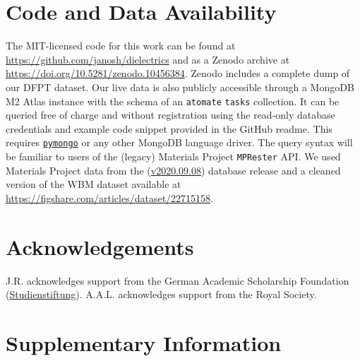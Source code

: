 \documentclass{article}
\begin{document}


\section*{Code and Data Availability}
\label{sec:code-availability}

The MIT-licensed code for this work can be found at \url{https://github.com/janosh/dielectrics} and as a Zenodo archive at \href{https://doi.org/10.5281/zenodo.10456384}{https://doi.org/10.5281/zenodo.10456384}.
Zenodo includes a complete dump of our DFPT dataset.
Our live data is also publicly accessible through a MongoDB M2 Atlas instance with the schema of an \texttt{atomate} \texttt{tasks} collection.
It can be queried free of charge and without registration using the read-only database credentials and example code snippet provided in the GitHub readme.
This requires \href{https://pymongo.readthedocs.io}{\texttt{pymongo}} or any other MongoDB language driver.
The query syntax will be familiar to users of the (legacy) Materials Project \texttt{MPRester} API.
We used Materials Project data from the (\href{https://docs.materialsproject.org/changes/database-versions}{v2020.09.08}) database release and a cleaned version of the WBM dataset \cite{wang_predicting_2021} available at \url{https://figshare.com/articles/dataset/22715158}.

\section*{Acknowledgements}

J.R. acknowledges support from the German Academic Scholarship Foundation (\href{https://wikipedia.org/wiki/Studienstiftung}{Studienstiftung}).
A.A.L. acknowledges support from the Royal Society.

\printbibliography

\clearpage
\appendix

\section*{Supplementary Information}
\end{document}
